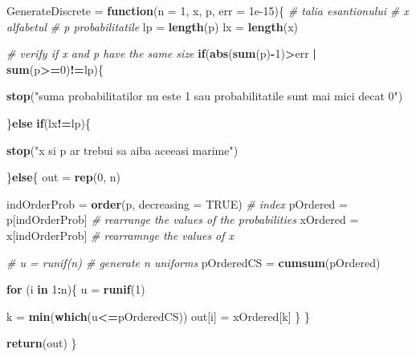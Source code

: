 \documentclass[]{article}
\newenvironment{Shaded}{\begin{snugshade}}{\end{snugshade}}
\newcommand{\KeywordTok}[1]{\textcolor[rgb]{0.13,0.29,0.53}{\textbf{#1}}}
\newcommand{\DataTypeTok}[1]{\textcolor[rgb]{0.13,0.29,0.53}{#1}}
\newcommand{\DecValTok}[1]{\textcolor[rgb]{0.00,0.00,0.81}{#1}}
\newcommand{\FloatTok}[1]{\textcolor[rgb]{0.00,0.00,0.81}{#1}}
\newcommand{\StringTok}[1]{\textcolor[rgb]{0.31,0.60,0.02}{#1}}
\newcommand{\CommentTok}[1]{\textcolor[rgb]{0.56,0.35,0.01}{\textit{#1}}}
\newcommand{\OtherTok}[1]{\textcolor[rgb]{0.56,0.35,0.01}{#1}}
\newcommand{\ControlFlowTok}[1]{\textcolor[rgb]{0.13,0.29,0.53}{\textbf{#1}}}
\newcommand{\OperatorTok}[1]{\textcolor[rgb]{0.81,0.36,0.00}{\textbf{#1}}}
\newcommand{\NormalTok}[1]{#1}
\begin{document}
\begin{Shaded}
\begin{Highlighting}[]
\NormalTok{GenerateDiscrete =}\StringTok{ }\ControlFlowTok{function}\NormalTok{(}\DataTypeTok{n =} \DecValTok{1}\NormalTok{, x, p, }\DataTypeTok{err =} \FloatTok{1e-15}\NormalTok{)\{}
  \CommentTok{# talia esantionului}
  \CommentTok{# x alfabetul }
  \CommentTok{# p probabilitatile}
\NormalTok{  lp =}\StringTok{ }\KeywordTok{length}\NormalTok{(p)}
\NormalTok{  lx =}\StringTok{ }\KeywordTok{length}\NormalTok{(x)}
  
  \CommentTok{# verify if x and p have the same size }
  \ControlFlowTok{if}\NormalTok{(}\KeywordTok{abs}\NormalTok{(}\KeywordTok{sum}\NormalTok{(p)}\OperatorTok{-}\DecValTok{1}\NormalTok{)}\OperatorTok{>}\NormalTok{err }\OperatorTok{|}\StringTok{ }\KeywordTok{sum}\NormalTok{(p}\OperatorTok{>=}\DecValTok{0}\NormalTok{)}\OperatorTok{!=}\NormalTok{lp)\{}
    
    \KeywordTok{stop}\NormalTok{(}\StringTok{"suma probabilitatilor nu este 1 sau probabilitatile sunt mai mici decat 0"}\NormalTok{)}
    
\NormalTok{  \}}\ControlFlowTok{else} \ControlFlowTok{if}\NormalTok{(lx}\OperatorTok{!=}\NormalTok{lp)\{}
    
    \KeywordTok{stop}\NormalTok{(}\StringTok{"x si p ar trebui sa aiba aceeasi marime"}\NormalTok{)}
    
\NormalTok{  \}}\ControlFlowTok{else}\NormalTok{\{}
\NormalTok{    out =}\StringTok{ }\KeywordTok{rep}\NormalTok{(}\DecValTok{0}\NormalTok{, n)}
    
\NormalTok{    indOrderProb =}\StringTok{ }\KeywordTok{order}\NormalTok{(p, }\DataTypeTok{decreasing =} \OtherTok{TRUE}\NormalTok{) }\CommentTok{# index}
\NormalTok{    pOrdered =}\StringTok{ }\NormalTok{p[indOrderProb] }\CommentTok{# rearrange the values of the probabilities }
\NormalTok{    xOrdered =}\StringTok{ }\NormalTok{x[indOrderProb] }\CommentTok{# rearramnge the values of x}
    
    \CommentTok{# u = runif(n) # generate n uniforms}
\NormalTok{    pOrderedCS =}\StringTok{ }\KeywordTok{cumsum}\NormalTok{(pOrdered)}
    
    \ControlFlowTok{for}\NormalTok{ (i }\ControlFlowTok{in} \DecValTok{1}\OperatorTok{:}\NormalTok{n)\{}
\NormalTok{      u =}\StringTok{ }\KeywordTok{runif}\NormalTok{(}\DecValTok{1}\NormalTok{)}
      
\NormalTok{      k =}\StringTok{ }\KeywordTok{min}\NormalTok{(}\KeywordTok{which}\NormalTok{(u}\OperatorTok{<=}\NormalTok{pOrderedCS))}
\NormalTok{      out[i] =}\StringTok{ }\NormalTok{xOrdered[k]}
\NormalTok{    \}}
\NormalTok{  \}}
  
  \KeywordTok{return}\NormalTok{(out)}
\NormalTok{\}}
\end{Highlighting}
\end{Shaded}
\end{document}
